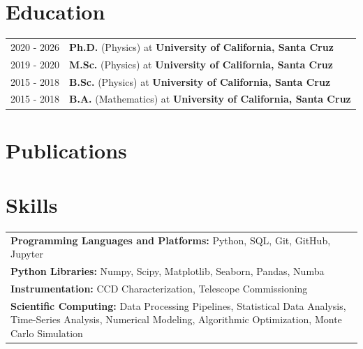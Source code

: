 \documentclass[a4paper,12pt]{article}
\begin{document}
\section{Education}
\begin{tabularx}{\linewidth}{@{}l X@{}}
2020 - 2026 & \textbf{Ph.D.} (Physics) at \textbf{University of California, Santa Cruz} \hfill  \\

2019 - 2020 & \textbf{M.Sc.} (Physics) at \textbf{University of California, Santa Cruz} \hfill  \\ 

2015 - 2018 & \textbf{B.Sc.} (Physics) at \textbf{University of California, Santa Cruz} \hfill  \\ 

2015 - 2018 & \textbf{B.A.} (Mathematics) at \textbf{University of California, Santa Cruz} \hfill  \\ 
\end{tabularx}

\section{Publications}
\begin{refsection}
\nocite{*}
\printbibliography[heading=none]
\end{refsection}

\section{Skills}
\begin{tabularx}{\linewidth}{@{} X@{}}
\textbf{Programming Languages and Platforms:}  \normalsize{Python, SQL, Git, GitHub, Jupyter} \hfill \\
\textbf{Python Libraries:}  \normalsize{Numpy, Scipy, Matplotlib, Seaborn, Pandas, Numba} \hfill \\
\textbf{Instrumentation:} \normalsize{CCD Characterization, Telescope Commissioning} \hfill \\
\textbf{Scientific Computing:} \normalsize{Data Processing Pipelines, Statistical Data Analysis, Time-Series Analysis, Numerical Modeling, Algorithmic Optimization, Monte Carlo Simulation}  \hfill \\
\end{tabularx}

\vfill
{}
\end{document}
